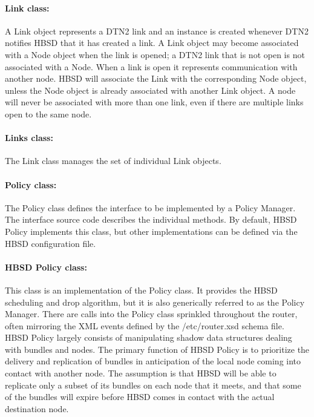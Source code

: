 \paragraph{Link class:}

A Link object represents a DTN2 link and an instance is created whenever DTN2
notifies HBSD that it has created a link. A Link object may become associated
with a Node object when the link is opened; a DTN2 link that is not open is
not associated with a Node. When a link is open it represents communication
with another node. HBSD will associate the Link with the corresponding Node
object, unless the Node object is already associated with another Link object.
A node will never be associated with more than one link, even if there are
multiple links open to the same node.

\paragraph{Links class:}
The Link class manages the set of individual Link objects.

\paragraph{Policy class:}
The Policy class defines the interface to be implemented by a Policy Manager.
The interface source code describes the individual methods. By default,
HBSD Policy implements this class, but other implementations can be defined
via the HBSD configuration file.

\paragraph{HBSD Policy class:}

This class is an implementation of the Policy class. It provides the HBSD
scheduling and drop algorithm, but it is also generically referred to as the
Policy Manager. There are calls into the Policy class sprinkled throughout the
router, often mirroring the XML events defined by the /etc/router.xsd schema
file. HBSD Policy largely consists of manipulating shadow data structures
dealing with bundles and nodes. The primary function of HBSD Policy is to
prioritize the delivery and replication of bundles in anticipation of the
local node coming into contact with another node. The assumption is that HBSD
will be able to replicate only a subset of its bundles on each node that it
meets, and that some of the bundles will expire before HBSD comes in contact
with the actual destination node.


